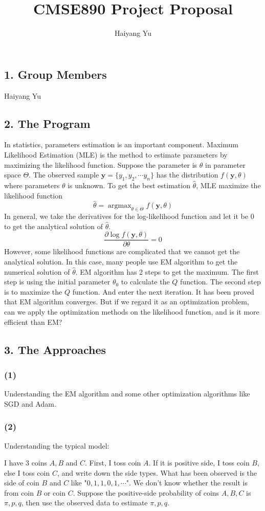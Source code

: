 \documentclass{article}
\title{CMSE890 Project Proposal}
\author{Haiyang Yu}
\begin{document}
\maketitle
\subsection*{1. Group Members}
Haiyang Yu
\subsection*{2. The Program}
In statistics, parameters estimation is an important component. Maximum Likelihood Estimation (MLE) is the method to estimate parameters by maximizing the likelihood function. Suppose the parameter is $\theta$ in parameter space $\Theta$. The observed sample $\bm{y}=\{y_{1},y_{2},\cdots y_{n}\}$ has the distribution $f(\bm{y},\theta)$ where parameters $\theta$ is unknown. To get the best estimation $\hat{\theta}$, MLE maximize the likelihood function 
$$\hat{\theta}=\mathop{\arg\max}_{\theta\in\Theta}f(\bm{y},\theta)$$
In general, we take the derivatives for the log-likelihood function and let it be 0 to get the analytical solution of $\hat{\theta}$.
$$\frac{\partial \log{f(\bm{y},\theta)}}{\partial \theta}=0$$
However, some likelihood functions are complicated that we cannot get the analytical solution. In this case, many people use EM algorithm to get the numerical solution of $\hat{\theta}$. EM algorithm has 2 steps to get the maximum. The first step is using the initial parameter $\theta_{0}$ to calculate the $Q$ function.
The second step is to maximize the $Q$ function. And enter the next iteration. It has been proved that EM algorithm converges. But if we regard it as an optimization problem, can we apply the optimization methods on the likelihood function, and is it more efficient than EM?
\subsection*{3. The Approaches}
\subsubsection*{(1)}
Understanding the EM algorithm and some other optimization algorithms like SGD and Adam.
\subsubsection*{(2)}
Understanding the typical model:
 
 I have 3 coins $A,B$ and $C$. First, I toss coin $A$. If it is positive side, I toss coin $B$, else I toss coin $C$, and write down the side types. What has been observed is the side of coin $B$ and $C$ like "$0,1,1,0,1,\cdots$". We don't know whether the result is from coin $B$ or coin $C$. Suppose the positive-side probability of coins $A,B,C$ is $\pi,p,q$, then use the observed data to estimate $\pi,p,q$.
\end{document}
